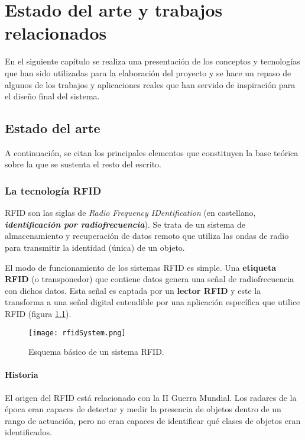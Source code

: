 
\chapter{Estado del arte y trabajos relacionados}
En el siguiente capítulo se realiza una presentación de los conceptos y
tecnologías que han sido utilizadas para la elaboración del proyecto y se hace
un repaso de algunos de los trabajos y aplicaciones reales que han servido de
inspiración para el diseño final del sistema.

\section{Estado del arte}
A continuación, se citan los principales elementos que constituyen la base
teórica sobre la que se sustenta el resto del escrito.

  \subsection{La tecnología \acs{RFID}}
\acs{RFID} son las siglas de \emph{Radio Frequency IDentification} (en
castellano, \emph{\textbf{identificación por radiofrecuencia}}). Se trata de un
sistema de almacenamiento y recuperación de datos remoto que utiliza las ondas
de radio para transmitir la identidad (única) de un objeto.

El modo de funcionamiento de los sistemas \acs{RFID} es simple. Una
\textbf{etiqueta \acs{RFID}} (o transponedor) que contiene datos genera una
señal de radiofrecuencia con dichos datos. Esta señal es captada por un
\textbf{lector \acs{RFID}} y este la transforma a una señal digital entendible
por una aplicación específica que utilice \acs{RFID} (figura
\ref{fig:rfidSystem}).

\begin{figure}[!h]
  \begin{center}
    \texttt{[image: rfidSystem.png]}
    \caption{Esquema básico de un sistema \acs{RFID}.}
    \label{fig:rfidSystem}
  \end{center}
\end{figure}

    \subsubsection{Historia}
  El origen del \acs{RFID} está relacionado con la II Guerra Mundial. Los
  radares de la época eran capaces de detectar y medir la presencia de objetos
  dentro de un rango de actuación, pero no eran capaces de identificar qué
  clases de objetos eran identificados.

